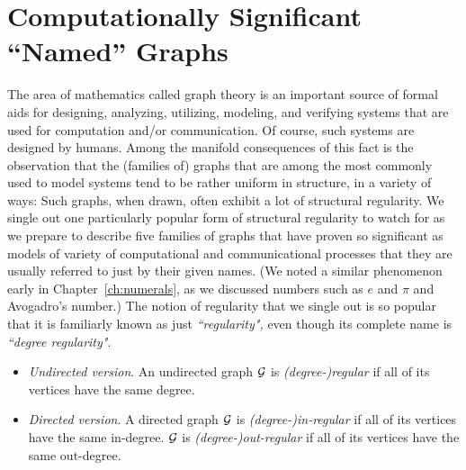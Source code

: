 
\section{Computationally Significant ``Named'' Graphs}
\label{sec:graphs-important-families}

The area of mathematics called graph theory is an important source of formal aids for designing, analyzing, utilizing, modeling, and verifying systems that are used for computation and/or communication.  Of course, such systems are designed by humans.  Among the manifold consequences of this fact is the observation that the (families of) graphs that are among the most commonly used to model systems tend to be rather uniform in structure, in a variety of ways: Such graphs, when drawn, often exhibit a lot of structural regularity.  We single out one particularly popular form of structural regularity to watch for as we prepare to describe five families of graphs that have proven so significant as models of variety of computational and communicational processes that they are usually referred to just by their given names.  (We noted a similar phenomenon early in Chapter~\ref{ch:numerals}, as we discussed numbers such as $e$ and $\pi$ and Avogadro's number.)  The notion of regularity that we single out is so popular that it is familiarly known as just {\it ``regularity",} even though its complete name is
{\it ``degree regularity"}.
\begin{itemize}
\item
{\em Undirected version}.
An undirected graph $\mbox{$\cal G$}$ is {\it (degree-)regular} if all of its vertices have the same degree.
\medskip\item
{\em Directed version}.
A directed graph $\mbox{$\cal G$}$ is {\it (degree-)in-regular} if all of its vertices have the same in-degree.  $\mbox{$\cal G$}$ is {\it (degree-)out-regular} if all of its vertices have the same out-degree.
\end{itemize}

  

\medskip

